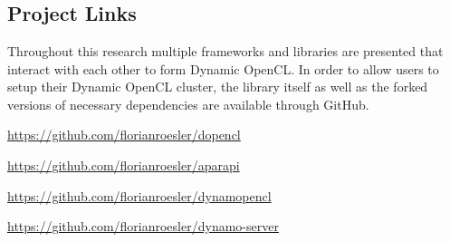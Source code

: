 \chapter{\appendixname}

\section{Project Links}
\label{appendix:links}
Throughout this research multiple frameworks and libraries are presented that interact with each other to form Dynamic OpenCL. In order to allow users to setup their Dynamic OpenCL cluster, the library itself as well as the forked versions of necessary dependencies are available through GitHub.

\begin{description}[align=left]
	\item [dOpenCL] \url{https://github.com/florianroesler/dopencl}
	\item [Aparapi] \url{https://github.com/florianroesler/aparapi}
	\item [Dynamic OpenCL] \url{https://github.com/florianroesler/dynamopencl}
	\item [Dynamic OpenCL Web Server Demo] \url{https://github.com/florianroesler/dynamo-server}
\end{description}

